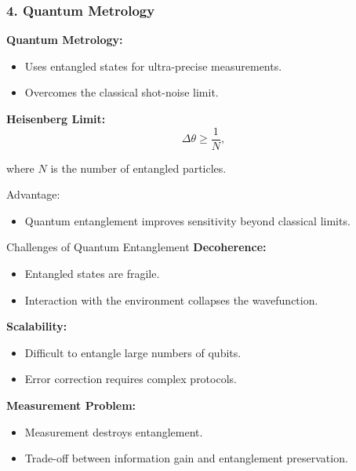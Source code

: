 \documentclass{beamer}
\begin{document}
\begin{frame}
\frametitle{4. Quantum Metrology}

\textbf{Quantum Metrology:}
\begin{itemize}
    \item Uses entangled states for ultra-precise measurements.
    \item Overcomes the classical shot-noise limit.
\end{itemize}

\textbf{Heisenberg Limit:}
\[
\Delta \theta \ge \frac{1}{N},
\]

where \( N \) is the number of entangled particles.  

\begin{block}{Advantage:}
\begin{itemize}
\item Quantum entanglement improves sensitivity beyond classical limits.
\end{itemize}
\end{block}
\end{frame}

\begin{frame}{Challenges of Quantum Entanglement}
\textbf{Decoherence:}
\begin{itemize}
    \item Entangled states are fragile.
    \item Interaction with the environment collapses the wavefunction.
\end{itemize}

\textbf{Scalability:}
\begin{itemize}
    \item Difficult to entangle large numbers of qubits.
    \item Error correction requires complex protocols.
\end{itemize}

\textbf{Measurement Problem:}
\begin{itemize}
    \item Measurement destroys entanglement.
    \item Trade-off between information gain and entanglement preservation.
\end{itemize}
\end{frame}
\end{document}
